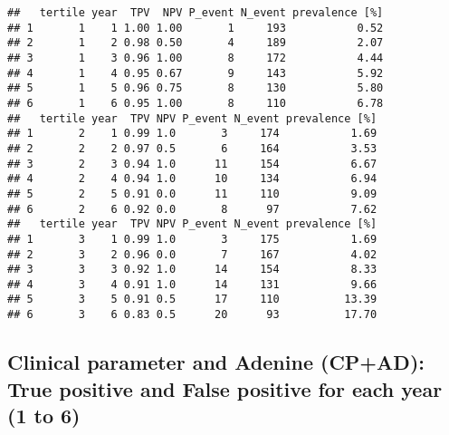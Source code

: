 \documentclass[
]{article}
\begin{document}
\begin{verbatim}
##   tertile year  TPV  NPV P_event N_event prevalence [%]
## 1       1    1 1.00 1.00       1     193           0.52
## 2       1    2 0.98 0.50       4     189           2.07
## 3       1    3 0.96 1.00       8     172           4.44
## 4       1    4 0.95 0.67       9     143           5.92
## 5       1    5 0.96 0.75       8     130           5.80
## 6       1    6 0.95 1.00       8     110           6.78
##   tertile year  TPV NPV P_event N_event prevalence [%]
## 1       2    1 0.99 1.0       3     174           1.69
## 2       2    2 0.97 0.5       6     164           3.53
## 3       2    3 0.94 1.0      11     154           6.67
## 4       2    4 0.94 1.0      10     134           6.94
## 5       2    5 0.91 0.0      11     110           9.09
## 6       2    6 0.92 0.0       8      97           7.62
##   tertile year  TPV NPV P_event N_event prevalence [%]
## 1       3    1 0.99 1.0       3     175           1.69
## 2       3    2 0.96 0.0       7     167           4.02
## 3       3    3 0.92 1.0      14     154           8.33
## 4       3    4 0.91 1.0      14     131           9.66
## 5       3    5 0.91 0.5      17     110          13.39
## 6       3    6 0.83 0.5      20      93          17.70
\end{verbatim}

\hypertarget{clinical-parameter-and-adenine-cpad-true-positive-and-false-positive-for-each-year-1-to-6-2}{%
\subsection{Clinical parameter and Adenine (CP+AD): True positive and
False positive for each year (1 to
6)}\label{clinical-parameter-and-adenine-cpad-true-positive-and-false-positive-for-each-year-1-to-6-2}}
\end{document}

